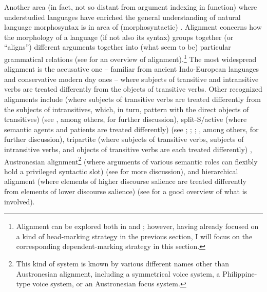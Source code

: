 \documentclass[output=paper]{langsci/langscibook}
\begin{document}
{Another area (in fact, not so distant from argument indexing in function) where understudied languages have enriched the general understanding of natural language morphosyntax is in area of (morphosyntactic) . Alignment concerns how the morphology of a language (if not also its syntax) groups together (or ``aligns'') different arguments together into (what seem to be) particular grammatical relations (see \citealt{bicknich09} for an overview of alignment).\footnote{Alignment can be explored both in  and  \citep{Nichols86a-u}; however, having already focused on a kind of head-marking strategy in the previous section, I will focus on the corresponding dependent-marking strategy in this section.} The most widespread alignment is the accusative one -- familiar from ancient Indo-European languages and conservative modern day ones -- where subjects of transitive and intransitive verbs are treated differently from the objects of transitive verbs. Other recognized alignments include  (where subjects of transitive verbs are treated differently from the subjects of intransitives, which, in turn, pattern with the direct objects of transitives) (see \citealt{comrie78erg,plank79,dixon79,dixon94}, among others, for further discussion), split-S/active (where semantic agents and patients are treated differently) (see \citealt{klimov73,klimov74}; \citealt[Chapter 4]{dixon94}; \citealt{mithun91}; \citealt{wichdon08}, among others, for further discussion), tripartite (where subjects of transitive verbs, subjects of intransitive verbs, and objects of transitive verbs are each treated differently) \citep[39--40]{dixon94}, Austronesian alignment\footnote{This kind of system is known by various different names other than Austronesian alignment, including a symmetrical voice system, a Philippine-type voice system, or an Austronesian focus system.} (where arguments of various semantic roles can flexibly hold a privileged syntactic slot) (see \citealt{schachter76,ross02,himmelmann05typchar} for more discussion), and hierarchical alignment (where elements of higher discourse salience are treated differently from elements of lower discourse salience) (see \citealt{jacqant14} for a good overview of what is involved).    

}
\end{document}
